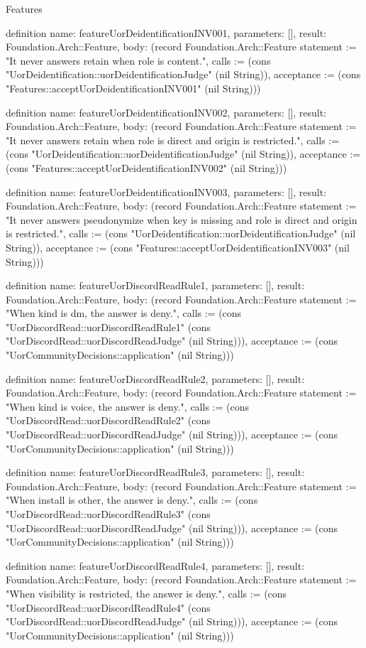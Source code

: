 \begin{lexlean}{Features}
\begin{semanticmodule}
definition{
  name: featureUorDeidentificationINV001,
  parameters: [],
  result: Foundation.Arch::Feature,
  body: (record Foundation.Arch::Feature {statement := "It never answers retain when role is content.", calls := (cons "UorDeidentification::uorDeidentificationJudge" (nil String)), acceptance := (cons "Features::acceptUorDeidentificationINV001" (nil String))})
}

definition{
  name: featureUorDeidentificationINV002,
  parameters: [],
  result: Foundation.Arch::Feature,
  body: (record Foundation.Arch::Feature {statement := "It never answers retain when role is direct and origin is restricted.", calls := (cons "UorDeidentification::uorDeidentificationJudge" (nil String)), acceptance := (cons "Features::acceptUorDeidentificationINV002" (nil String))})
}

definition{
  name: featureUorDeidentificationINV003,
  parameters: [],
  result: Foundation.Arch::Feature,
  body: (record Foundation.Arch::Feature {statement := "It never answers pseudonymize when key is missing and role is direct and origin is restricted.", calls := (cons "UorDeidentification::uorDeidentificationJudge" (nil String)), acceptance := (cons "Features::acceptUorDeidentificationINV003" (nil String))})
}

definition{
  name: featureUorDiscordReadRule1,
  parameters: [],
  result: Foundation.Arch::Feature,
  body: (record Foundation.Arch::Feature {statement := "When kind is dm, the answer is deny.", calls := (cons "UorDiscordRead::uorDiscordReadRule1" (cons "UorDiscordRead::uorDiscordReadJudge" (nil String))), acceptance := (cons "UorCommunityDecisions::application" (nil String))})
}

definition{
  name: featureUorDiscordReadRule2,
  parameters: [],
  result: Foundation.Arch::Feature,
  body: (record Foundation.Arch::Feature {statement := "When kind is voice, the answer is deny.", calls := (cons "UorDiscordRead::uorDiscordReadRule2" (cons "UorDiscordRead::uorDiscordReadJudge" (nil String))), acceptance := (cons "UorCommunityDecisions::application" (nil String))})
}

definition{
  name: featureUorDiscordReadRule3,
  parameters: [],
  result: Foundation.Arch::Feature,
  body: (record Foundation.Arch::Feature {statement := "When install is other, the answer is deny.", calls := (cons "UorDiscordRead::uorDiscordReadRule3" (cons "UorDiscordRead::uorDiscordReadJudge" (nil String))), acceptance := (cons "UorCommunityDecisions::application" (nil String))})
}

definition{
  name: featureUorDiscordReadRule4,
  parameters: [],
  result: Foundation.Arch::Feature,
  body: (record Foundation.Arch::Feature {statement := "When visibility is restricted, the answer is deny.", calls := (cons "UorDiscordRead::uorDiscordReadRule4" (cons "UorDiscordRead::uorDiscordReadJudge" (nil String))), acceptance := (cons "UorCommunityDecisions::application" (nil String))})
}


\end{semanticmodule}
\end{lexlean}
